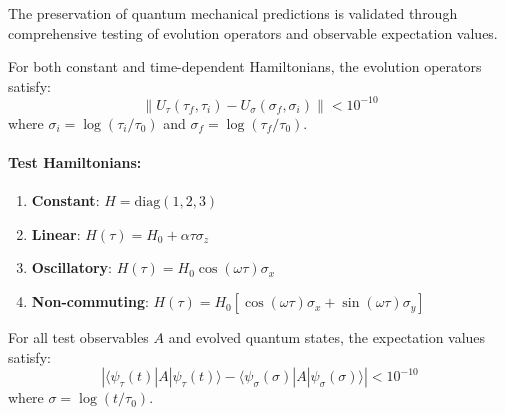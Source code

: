 The preservation of quantum mechanical predictions is validated through comprehensive testing of evolution operators and observable expectation values.

\begin{theorem}
\label{thm:unitary_evolution_validation}
For both constant and time-dependent Hamiltonians, the evolution operators satisfy:
\begin{equation}
\|U_\tau(\tau_f, \tau_i) - U_\sigma(\sigma_f, \sigma_i)\| < 10^{-10}
\end{equation}
where $\sigma_i = \log(\tau_i/\tau_0)$ and $\sigma_f = \log(\tau_f/\tau_0)$.
\end{theorem}

\paragraph{Test Hamiltonians:}
\begin{enumerate}
\item \textbf{Constant}: $H = \text{diag}(1, 2, 3)$ 
\item \textbf{Linear}: $H(\tau) = H_0 + \alpha \tau \sigma_z$
\item \textbf{Oscillatory}: $H(\tau) = H_0 \cos(\omega \tau) \sigma_x$
\item \textbf{Non-commuting}: $H(\tau) = H_0[\cos(\omega\tau)\sigma_x + \sin(\omega\tau)\sigma_y]$
\end{enumerate}

\begin{theorem}
\label{thm:observable_preservation_validation}
For all test observables $A$ and evolved quantum states, the expectation values satisfy:
\begin{equation}
|\langle \psi_\tau(t) | A | \psi_\tau(t) \rangle - \langle \psi_\sigma(\sigma) | A | \psi_\sigma(\sigma) \rangle| < 10^{-10}
\end{equation}
where $\sigma = \log(t/\tau_0)$.
\end{theorem}

